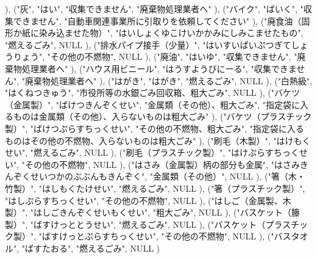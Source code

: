 ), ("灰", "はい", "収集できません", "廃棄物処理業者へ"
), ("バイク", "ばいく", "収集できません", "自動車関連事業所に引取りを依頼してください"
), ("廃食油（固形か紙に染み込ませた物）", "はいしょくゆこけいかかみにしみこませたもの", "燃えるごみ", NULL
), ("排水パイプ接手（少量）", "はいすいぱいぷつぎてしょうりょう", "その他の不燃物", NULL
), ("廃油", "はいゆ", "収集できません", "廃棄物処理業者へ"
), ("ハウス用ビニール", "はうすようびにーる", "収集できません", "廃棄物処理業者へ"
), ("はがき", "はがき", "燃えるごみ", NULL
), ("白熱級", "はくねつきゅう", "市役所等の水銀ごみ回収箱、粗大ごみ", NULL
), ("バケツ（金属製）", "ばけつきんぞくせい", "金属類（その他）、粗大ごみ", "指定袋に入るものは金属類（その他）、入らないものは粗大ごみ"
), ("バケツ（プラスチック製）", "ばけつぷらすちっくせい", "その他の不燃物、粗大ごみ", "指定袋に入るものはその他の不燃物、入らないものは粗大ごみ"
), ("刷毛（木製）", "はけもくせい", "燃えるごみ", NULL
), ("刷毛（プラスチック製）", "はけぷらすちっくせい", "その他の不燃物", NULL
), ("はさみ（金属製）柄の部分も金属", "はさみきんぞくせいつかのぶぶんもきんぞく", "金属類（その他）", NULL
), ("箸（木・竹製）", "はしもくたけせい", "燃えるごみ", NULL
), ("箸（プラスチック製）", "はしぷらすちっくせい", "その他の不燃物", NULL
), ("はしご（金属製、木製）", "はしごきんぞくせいもくせい", "粗大ごみ", NULL
), ("バスケット（籐製）", "ばすけっととうせい", "燃えるごみ", NULL
), ("バスケット（プラスチック製）", "ばすけっとぷらすちっくせい", "その他の不燃物", NULL
), ("バスタオル", "ばすたおる", "燃えるごみ", NULL
)
